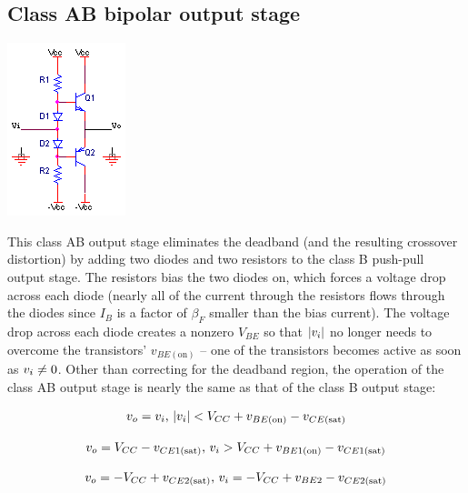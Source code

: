 \subsection{Class AB bipolar output stage}
\begin{center}
	\includegraphics{schematics/classABoutput.PNG}
\end{center}
This class AB output stage eliminates the deadband (and the resulting crossover distortion) by adding two diodes and two resistors to the class B push-pull output stage.
The resistors bias the two diodes on, which forces a voltage drop across each diode (nearly all of the current through the resistors flows through the diodes since $I_{B}$ is a factor of $\beta_{F}$ smaller than the bias current).
The voltage drop across each diode creates a nonzero $V_{BE}$ so that $|v_i|$ no longer needs to overcome the transistors' $v_{BE(\text{on})}$ -- one of the transistors becomes active as soon as $v_i \neq 0$. \autocite[365]{analysis-design-analog-ics}
Other than correcting for the deadband region, the operation of the class AB output stage is nearly the same as that of the class B output stage:

\textcolor{red}{
\begin{equation}
v_o = v_i\text{, }|v_i| < V_{CC} + v_{BE(\text{on})}-v_{CE(\text{sat})}
\end{equation}
}

\textcolor{red}{
\begin{equation}
v_o = V_{CC}-v_{CE1(\text{sat})}\text{, }v_i > V_{CC} + v_{BE1(\text{on})} - v_{CE1(\text{sat})}
\end{equation}
}

\textcolor{red}{
\begin{equation}
v_o = -V_{CC}+v_{CE2(\text{sat})}\text{, }v_i = -V_{CC}+v_{BE2}-v_{CE2(\text{sat})}
\end{equation}
}

